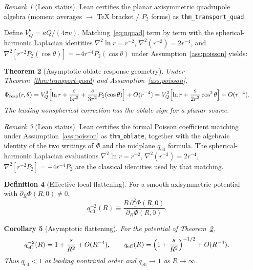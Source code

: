 \documentclass[11pt]{article}
\newtheorem{theorem}{Theorem}[section]
\newtheorem{corollary}[theorem]{Corollary}
\theoremstyle{definition}
\newtheorem{definition}[theorem]{Definition}
\theoremstyle{remark}
\newtheorem{remark}[theorem]{Remark}
\newcommand{\qeff}{q_{\mathrm{eff}}}
\begin{document}
\begin{remark}[Lean status]
Lean certifies the planar axisymmetric quadrupole algebra (moment averages $\to$ TeX bracket / $P_{2}$ forms) as \texttt{thm\_transport\_quad}.
\end{remark}

Define $V_{Q}^{2}=\kappa Q/(4\pi v)$.
Matching~\eqref{eq:nquad} term by term with the spherical-harmonic Laplacian identities
$\nabla^{2}\ln r=r^{-2}$, $\nabla^{2}(r^{-2})=2r^{-4}$, and $\nabla^{2}[r^{-2}P_{2}(\cos\theta)]=-4r^{-4}P_{2}(\cos\theta)$ under Assumption~\ref{ass:poisson} yields:

\begin{theorem}[Asymptotic oblate response geometry]
\label{thm:oblate}
Under Theorem~\ref{thm:transport-quad} and Assumption~\ref{ass:poisson},
\begin{equation}
  \Phi_{\mathrm{resp}}(r,\theta)
  =V_{Q}^{2}\Bigl[\ln r+\frac{s}{6r^{2}}+\frac{s}{3r^{2}}P_{2}(\cos\theta)\Bigr]+O(r^{-4})
  =V_{Q}^{2}\Bigl[\ln r+\frac{s}{2r^{2}}\cos^{2}\theta\Bigr]+O(r^{-4}).
\end{equation}
The leading nonspherical correction has the oblate sign for a planar source.
\end{theorem}

\begin{remark}[Lean status]
Lean certifies the formal Poisson coefficient matching under Assumption~\ref{ass:poisson} as \texttt{thm\_oblate}, together with the algebraic identity of the two writings of $\Phi$ and the midplane $\qeff$ formula.
The spherical-harmonic Laplacian evaluations $\nabla^{2}\ln r=r^{-2}$, $\nabla^{2}(r^{-2})=2r^{-4}$, $\nabla^{2}[r^{-2}P_{2}]=-4r^{-4}P_{2}$ are the classical identities used by that matching.
\end{remark}

\begin{definition}[Effective local flattening]
\label{def:qeff}
For a smooth axisymmetric potential with $\partial_{R}\Phi(R,0)\neq0$,
\begin{equation}
  \qeff^{-2}(R)\equiv\frac{R\,\partial_{z}^{2}\Phi(R,0)}{\partial_{R}\Phi(R,0)}.
\end{equation}
\end{definition}

\begin{corollary}[Asymptotic flattening]
\label{cor:qeff}
For the potential of Theorem~\ref{thm:oblate},
\begin{equation}
  \qeff^{-2}(R)=1+\frac{s}{R^{2}}+O(R^{-4}),
  \qquad
  \qeff(R)=\Bigl(1+\frac{s}{R^{2}}\Bigr)^{-1/2}+O(R^{-4}).
\end{equation}
Thus $\qeff<1$ at leading nontrivial order and $\qeff\to1$ as $R\to\infty$.
\end{corollary}
\end{document}
